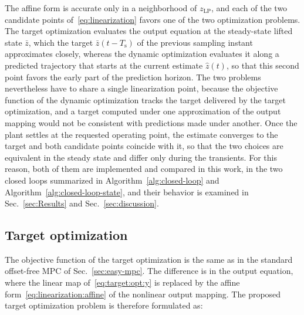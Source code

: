 \documentclass[preprint,12pt,authoryear]{elsarticle}
\theoremstyle{remark}
\newcommand{\ui}[2]{#1_{\text{#2}}}
\begin{document}
The affine form is accurate only in a neighborhood of $\ui{z}{LP}$, and each of the two candidate points of~\eqref{eq:linearization} favors one of the two optimization problems. The target optimization evaluates the output equation at the steady-state lifted state $\bar{z}$, which the target $\bar{z}(t-T_\text{s})$ of the previous sampling instant approximates closely, whereas the dynamic optimization evaluates it along a predicted trajectory that starts at the current estimate $\hat{z}(t)$, so that this second point favors the early part of the prediction horizon. The two problems nevertheless have to share a single linearization point, because the objective function of the dynamic optimization tracks the target delivered by the target optimization, and a target computed under one approximation of the output mapping would not be consistent with predictions made under another. Once the plant settles at the requested operating point, the estimate converges to the target and both candidate points coincide with it, so that the two choices are equivalent in the steady state and differ only during the transients. For this reason, both of them are implemented and compared in this work, in the two closed loops summarized in Algorithm~\ref{alg:closed-loop} and Algorithm~\ref{alg:closed-loop-state}, and their behavior is examined in Sec.~\ref{sec:Results} and Sec.~\ref{sec:discussion}.

\subsection{Target optimization}

The objective function of the target optimization is the same as in the standard offset-free MPC of Sec.~\ref{sec:easy-mpc}. The difference is in the output equation, where the linear map of~\eqref{eq:target:opt:y} is replaced by the affine form~\eqref{eq:linearization:affine} of the nonlinear output mapping. The proposed target optimization problem is therefore formulated as:
\end{document}
